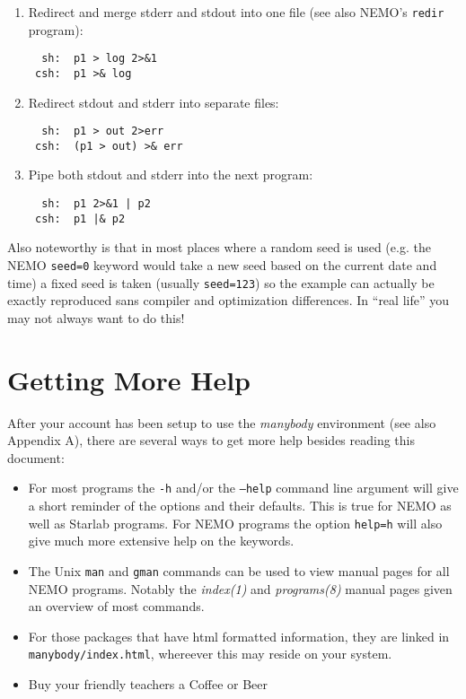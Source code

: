 \begin{enumerate}
\item 
Redirect and merge stderr and stdout into one file 
(see also NEMO's {\tt redir} program):
\footnotesize\begin{verbatim}
  sh:  p1 > log 2>&1
 csh:  p1 >& log
\end{verbatim}\normalsize
\item
Redirect stdout and stderr into separate files:
\footnotesize\begin{verbatim}
  sh:  p1 > out 2>err
 csh:  (p1 > out) >& err
\end{verbatim}\normalsize
\item
Pipe both stdout and stderr into the next program:
\footnotesize\begin{verbatim}
  sh:  p1 2>&1 | p2
 csh:  p1 |& p2
\end{verbatim}\normalsize
\end{enumerate}

Also noteworthy is that 
in most places where a random seed is used (e.g. the NEMO {\tt seed=0} keyword
would take a new seed based on the current date and time) 
a fixed seed is taken (usually {\tt seed=123}) 
so the example can actually be exactly reproduced sans compiler and optimization
differences. In ``real life'' you may not always want to do this!


\section*{Getting More Help}

After your account has been setup to use the {\it manybody} environment
(see also Appendix A), there are several ways to get more help besides
reading this document:
\begin{itemize}
\item
For most programs the {\tt -h} and/or the {\tt --help} 
command line argument will give a short
reminder of the options and their defaults. This is true for NEMO as well
as Starlab programs.
For NEMO programs the option {\tt help=h} will also give much more extensive help
on the keywords.

\item
The Unix {\tt man} and {\tt gman} commands can be used to view manual pages
for all NEMO programs. Notably the {\it index(1)} and {\it programs(8)}
manual pages given an overview of most commands.

\item
For those packages that have html formatted information, they are
linked in {\tt manybody/index.html}, whereever this may reside on your
system.

\item
Buy your friendly teachers a Coffee or Beer

\end{itemize}

